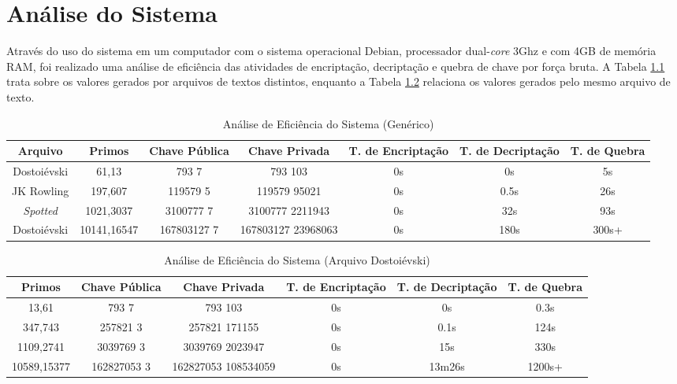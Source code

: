 \chapter[Análise do Sistema]{Análise do Sistema}
\label{chap:analise}
	Através do uso do sistema em um computador com o sistema operacional Debian, processador dual-\emph{core} 3Ghz e com 4GB de memória RAM, foi realizado uma análise de eficiência das atividades de encriptação, decriptação e quebra de chave por força bruta. A Tabela \ref{tab:primeira_tentativa} trata sobre os valores gerados por arquivos de textos distintos, enquanto a Tabela \ref{tab:segunda_tentativa} relaciona os valores gerados pelo mesmo arquivo de texto.
	\begin{landscape}
		\vspace*{\fill}
		\begin{table}[H]
			\centering
			\begin{tabular}{|c|c|c|c|c|c|c|}
			\hline
			\textbf{Arquivo} & \textbf{Primos} & \textbf{Chave Pública} & \textbf{Chave Privada} & \textbf{T. de Encriptação} & \textbf{T. de Decriptação} & \textbf{T. de Quebra} \\ \hline
			Dostoiévski & 61,13 & 793 7 & 793 103 & 0s & 0s & 5s \\ \hline
			JK Rowling & 197,607 & 119579 5 & 119579 95021 & 0s & 0.5s & 26s \\ \hline
			\emph{Spotted} & 1021,3037 & 3100777 7 & 3100777 2211943 & 0s & 32s & 93s \\ \hline
			Dostoiévski & 10141,16547 & 167803127 7 & 167803127 23968063 & 0s & 180s & 300s+ \\ \hline
			\end{tabular}
			\label{tab:primeira_tentativa}
			\caption[Análise de Eficiência do Sistema (Genérico)]{Análise de Eficiência do Sistema (Genérico)}
		\end{table}

		\begin{table}[H]
			\centering
			\begin{tabular}{|c|c|c|c|c|c|}
			\hline
			\textbf{Primos} & \textbf{Chave Pública} & \textbf{Chave Privada} & \textbf{T. de Encriptação} & \textbf{T. de Decriptação} & \textbf{T. de Quebra} \\ \hline
			13,61 & 793 7 & 793 103 & 0s & 0s & 0.3s \\ \hline
			347,743 & 257821 3 & 257821 171155 & 0s & 0.1s & 124s \\ \hline
			1109,2741 & 3039769 3 & 3039769 2023947 & 0s & 15s & 330s \\ \hline
			10589,15377 & 162827053 3 & 162827053 108534059 & 0s & 13m26s & 1200s+ \\ \hline
			\end{tabular}
			\label{tab:segunda_tentativa}
			\caption[Análise de Eficiência do Sistema (Arquivo Dostoiévski)]{Análise de Eficiência do Sistema (Arquivo Dostoiévski)}
		\end{table}
		\vspace*{\fill}
	\end{landscape}